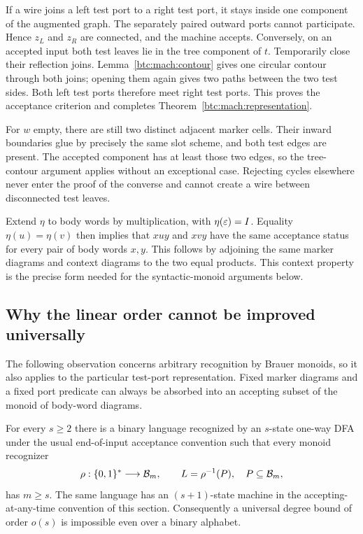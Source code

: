 If a wire joins a left test port to a right test port, it stays inside
one component of the augmented graph. The separately paired outward
ports cannot participate. Hence $z_L$ and $z_R$ are connected, and the
machine accepts. Conversely, on an accepted input both test leaves lie
in the tree component of $t$. Temporarily close their reflection joins.
Lemma~\ref{btc:mach:contour} gives one circular contour through both joins;
opening them again gives two paths between the two test sides. Both
left test ports therefore meet right test ports. This proves the
acceptance criterion and completes Theorem~\ref{btc:mach:representation}.

For $w$ empty, there are still two distinct adjacent marker cells. Their
inward boundaries glue by precisely the same slot scheme, and both test
edges are present. The accepted component has at least those two edges,
so the tree-contour argument applies without an exceptional case.
Rejecting cycles elsewhere never enter the proof of the converse and
cannot create a wire between disconnected test leaves.

Extend $\eta$ to body words by multiplication, with
$\eta(\varepsilon)=I$. Equality $\eta(u)=\eta(v)$ then implies
that $xuy$ and $xvy$ have the same acceptance status for every pair of
body words $x,y$. This follows by adjoining the same marker diagrams
and context diagrams to the two equal products. This context property
is the precise form needed for the syntactic-monoid arguments below.

\subsection{Why the linear order cannot be improved universally}

The following observation concerns arbitrary recognition by Brauer
monoids, so it also applies to the particular test-port representation.
Fixed marker diagrams and a fixed port predicate can always be absorbed
into an accepting subset of the monoid of body-word diagrams.

\begin{theorem}
\label{btc:mach:linear-optimality}
For every $s\ge2$ there is a binary language recognized by an $s$-state
one-way DFA under the usual end-of-input acceptance convention such that
every monoid recognizer
\[
 \rho:\{0,1\}^*\longrightarrow\mathcal{B}_{m},\qquad
 L=\rho^{-1}(P),\quad P\subseteq\mathcal{B}_{m},
\]
has $m\ge s$. The same language has an $(s+1)$-state machine in the
accepting-at-any-time convention of this section. Consequently a universal
degree bound of order $o(s)$ is impossible even over a binary alphabet.
\end{theorem}

